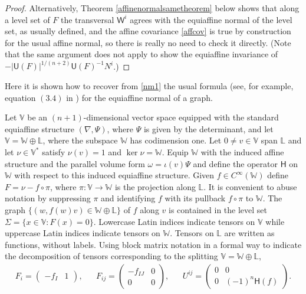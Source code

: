 \documentclass [leqno, 10pt]{amsart}
\theoremstyle{definition}
\numberwithin{equation}{section}
\newcommand{\stl}{\mathbb{L}}
\newcommand{\std}{\mathbb{V}^{\ast}}
\newcommand{\stw}{\mathbb{W}}
\newcommand{\imt}{\iota}
\newcommand{\U}{\mathsf{U}}
\renewcommand{\H}{\mathsf{H}}
\newcommand{\om}{\omega}
\newcommand{\nm}{\mathsf{W}}
\newcommand{\cinf}{C^{\infty}}
\newcommand{\ste}{\mathbb{V}}
\begin{document}
\begin{proof}
Alternatively, Theorem \ref{affinenormalsametheorem} below shows that along a level set of $F$ the transversal $\nm^{i}$ agrees with the equiaffine normal of the level set, as usually defined, and the affine covariance \eqref{affcov} is true by construction for the usual affine normal, so there is really no need to check it directly. (Note that the same argument does not apply to show the equiaffine invariance of $-|\U(F)|^{1/(n+2)}\U(F)^{-1}N^{i}$.)
\end{proof}

\begin{example}\label{graphsection}
Here it is shown how to recover from \eqref{nm1} the usual formula (see, for example, equation $(3.4)$ in \cite{Nomizu-Sasaki}) for the equiaffine normal of a graph. 

Let $\ste$ be an $(n+1)$-dimensional vector space equipped with the standard equiaffine structure $(\nabla, \Psi)$, where $\Psi$ is given by the determinant, and let $\ste = \stw \oplus \stl$, where the subspace $\stw$ has codimension one. Let $0 \neq v \in \ste$ span $\stl$ and let $\nu \in \std$ satisfy $\nu(v) = 1$ and $\ker \nu = \stw$. Equip $\stw$ with the induced affine structure and the parallel volume form $\om = \imt(v)\Psi$ and define the operator $\H$ on $\stw$ with respect to this induced equiaffine structure. Given $f \in \cinf(\stw)$ define $F = \nu - f\circ \pi$, where $\pi:\ste \to \stw$ is the projection along $\stl$.
It is convenient to abuse notation by suppressing $\pi$ and identifying $f$ with its pullback $f \circ \pi$ to $\stw$. The graph $\{(w, f(w)v) \in \stw \oplus \stl\}$ of $f$ along $v$ is contained in the level set $\Sigma = \{x \in \ste: F(x) = 0\}$. Lowercase Latin indices indicate tensors on $\ste$ while uppercase Latin indices indicate tensors on $\stw$. Tensors on $\stl$ are written as functions, without labels. 
Using block matrix notation in a formal way to indicate the decomposition of tensors corresponding to the splitting $\ste = \stw \oplus \stl$,
\begin{align}\label{hessG}
&F_{i} = \begin{pmatrix} -f_{I} & 1 \end{pmatrix},&
&F_{ij} = \begin{pmatrix} -f_{IJ} & 0\\ 0 & 0\end{pmatrix},&
&U^{ij} = \begin{pmatrix} 0 & 0\\ 0 & (-1)^{n}\H(f)\end{pmatrix}.&

\end{align}
\end{example}
\end{document}
